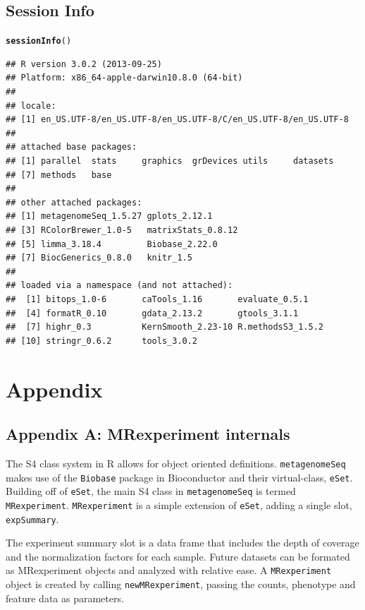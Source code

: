 \documentclass[a4paper,11pt]{article}\usepackage[]{graphicx}\usepackage[]{color}
\makeatletter
\newcommand{\hlstd}[1]{\textcolor[rgb]{0.345,0.345,0.345}{#1}}%
\newcommand{\hlkwd}[1]{\textcolor[rgb]{0.737,0.353,0.396}{\textbf{#1}}}%
\newenvironment{kframe}{%
 \def\at@end@of@kframe{}%
 \ifinner\ifhmode%
  \def\at@end@of@kframe{\end{minipage}}%
  \begin{minipage}{\columnwidth}%
 \fi\fi%
 \def\FrameCommand##1{\hskip\@totalleftmargin \hskip-\fboxsep
 \colorbox{shadecolor}{##1}\hskip-\fboxsep
     \hskip-\linewidth \hskip-\@totalleftmargin \hskip\columnwidth}%
 \MakeFramed {\advance\hsize-\width
   \@totalleftmargin\z@ \linewidth\hsize
   \@setminipage}}%
 {\par\unskip\endMakeFramed%
 \at@end@of@kframe}
\newenvironment{knitrout}{}{} %
\makeatother
\begin{document}
\subsection{Session Info}
\begin{knitrout}
\color{fgcolor}\begin{kframe}
\begin{alltt}
\hlkwd{sessionInfo}\hlstd{()}
\end{alltt}
\begin{verbatim}
## R version 3.0.2 (2013-09-25)
## Platform: x86_64-apple-darwin10.8.0 (64-bit)
## 
## locale:
## [1] en_US.UTF-8/en_US.UTF-8/en_US.UTF-8/C/en_US.UTF-8/en_US.UTF-8
## 
## attached base packages:
## [1] parallel  stats     graphics  grDevices utils     datasets 
## [7] methods   base     
## 
## other attached packages:
## [1] metagenomeSeq_1.5.27 gplots_2.12.1       
## [3] RColorBrewer_1.0-5   matrixStats_0.8.12  
## [5] limma_3.18.4         Biobase_2.22.0      
## [7] BiocGenerics_0.8.0   knitr_1.5           
## 
## loaded via a namespace (and not attached):
##  [1] bitops_1.0-6       caTools_1.16       evaluate_0.5.1    
##  [4] formatR_0.10       gdata_2.13.2       gtools_3.1.1      
##  [7] highr_0.3          KernSmooth_2.23-10 R.methodsS3_1.5.2 
## [10] stringr_0.6.2      tools_3.0.2
\end{verbatim}
\end{kframe}
\end{knitrout}


\newpage
\section{Appendix}
\subsection{Appendix A: MRexperiment internals}
The S4 class system in R allows for object oriented definitions. \texttt{metagenomeSeq} makes use of the \texttt{Biobase} package in Bioconductor and their virtual-class, \texttt{eSet}. Building off of \texttt{eSet}, the main S4 class in \texttt{metagenomeSeq} is termed \texttt{MRexperiment}. \texttt{MRexperiment} is a simple extension of \texttt{eSet}, adding a single slot, \texttt{expSummary}.

The experiment summary slot is a data frame that includes the depth of coverage and the normalization factors for each sample. Future datasets can be formated as MRexperiment objects and analyzed with relative ease. A \texttt{MRexperiment} object is created by calling \texttt{newMRexperiment}, passing the counts, phenotype and feature data as parameters.
\end{document}
